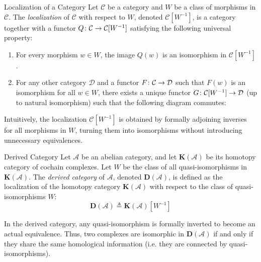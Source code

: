 \documentclass[a4paper]{article}
\begin{document}
\begin{snippetdefinition}{Localization of a Category}
    Let \(\mathcal C\) be a category and \(W\) be a class of morphisms in \(\mathcal C\). The \emph{localization} of \(\mathcal C\) with respect to \(W\), denoted \(\mathcal C[W^{-1}]\), is a category together with a functor \(Q \colon \mathcal C \to \mathcal C[W^{-1}]\) satisfying the following universal property:
    \begin{enumerate}
        \item For every morphism \(w \in W\), the image \(Q(w)\) is an isomorphism in \(\mathcal C[W^{-1}]\).
        \item For any other category \(\mathcal D\) and a functor \(F \colon \mathcal C \to \mathcal D\) such that \(F(w)\) is an isomorphism for all \(w \in W\), there exists a unique functor \(G \colon \mathcal C[W^{-1}] \to \mathcal D\) (up to natural isomorphism) such that the following diagram commutes:
        \begin{center}
        \end{center}
    \end{enumerate}
\end{snippetdefinition}

Intuitively, the localization \(\mathcal C[W^{-1}]\) is obtained by formally adjoining inverses for all morphisms in \(W\), turning them into isomorphisms without introducing unnecessary equivalences.

\begin{snippetdefinition}{Derived Category}
    Let \(\mathcal A\) be an abelian category, and let \(\mathbf{K}(\mathcal A)\) be its homotopy category of cochain complexes. Let \(W\) be the class of all quasi-isomorphisms in \(\mathbf{K}(\mathcal A)\).
    The \emph{derived category} of \(\mathcal A\), denoted \(\mathbf{D}(\mathcal A)\), is defined as the localization of the homotopy category \(\mathbf{K}(\mathcal A)\) with respect to the class of quasi-isomorphisms \(W\):
    \[
        \mathbf{D}(\mathcal A) \triangleq \mathbf{K}(\mathcal A)[W^{-1}]
    \]
\end{snippetdefinition}

In the derived category, any quasi-isomorphism is formally inverted to become an actual equivalence. Thus, two complexes are isomorphic in \(\mathbf{D}(\mathcal A)\) if and only if they share the same homological information (i.e. they are connected by quasi-isomorphisms).
\end{document}

